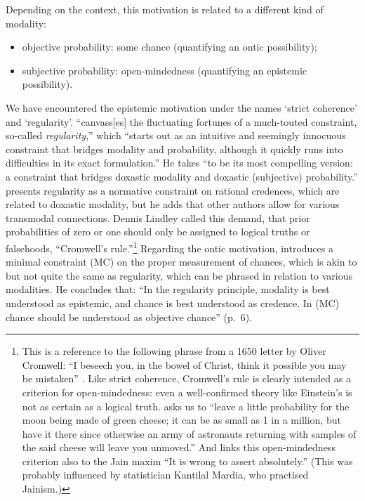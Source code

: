 Depending on the context, this motivation is related to a different kind of modality:
\begin{itemize}
  \item objective probability: some chance (quantifying an ontic possibility);
  \item subjective probability: open-mindedness (quantifying an epistemic possibility).
\end{itemize}
We have encountered the epistemic motivation under the names `strict coherence' and `regularity'.
\citet[p.~1 of draft]{Hajek:2012b} ``canvass[es] the fluctuating fortunes of a much-touted constraint, so-called \emph{regularity},'' which ``starts out as an intuitive and seemingly innocuous constraint that bridges modality and probability, although it quickly runs into difficulties in its exact formulation.'' He takes ``to be its most compelling version: a constraint that bridges doxastic modality and doxastic (subjective) probability.''
\citet{Easwaran:2014} presents regularity as a normative constraint on rational credences, which are related to doxastic modality, but he adds that other authors allow for various transmodal connections.
Dennis Lindley called this demand, that prior probabilities of zero or one should only be assigned to logical truths or falsehoods, ``Cromwell's rule.''\footnote{This is a reference to the following phrase from a 1650 letter by Oliver Cromwell: ``I beseech you, in the bowel of Christ, think it possible you may be mistaken'' \citet[reprinted in][]{Carlyle:1845}. Like strict coherence, Cromwell's rule is clearly intended as a criterion for open-mindedness: even a well-confirmed theory like Einstein's is not as certain as a logical truth. \citet[p.~104]{Lindley:1991} asks us to ``leave a little probability for the moon being made of green cheese; it can be as small as 1 in a million, but have it there since otherwise an army of astronauts returning with samples of the said cheese will leave you unmoved.'' And \citet[p.~91]{Lindley:2006} links this open-mindedness criterion also to the Jain maxim ``It is wrong to assert absolutely.'' (This was probably influenced by statistician Kantilal Mardia, who practised Jainism.)}
Regarding the ontic motivation, \citet{Hofweber:2014} introduces a minimal constraint (MC) on the proper measurement of chances, which is akin to but not quite the same as regularity, which can be phrased in relation to various modalities. He concludes that: ``In the regularity principle, modality is best understood as epistemic, and chance is best understood as credence. In (MC) chance should be understood as objective chance'' (p.~6).

